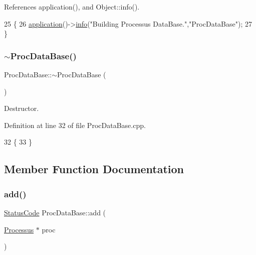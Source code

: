 References application(), and Object\+::info().


\begin{DoxyCode}
25                              \{
26   \hyperlink{Tools_8h_a27885a3c35afe79029fb830f32f66458}{application}()->\hyperlink{classObject_a644fd329ea4cb85f54fa6846484b84a8}{info}(\textcolor{stringliteral}{"Building Processus DataBase."},\textcolor{stringliteral}{"ProcDataBase"});
27 \}
\end{DoxyCode}
\mbox{\label{classProcDataBase_a65ec1212978a4996b5132bfaf1d0738d}} 
\subsubsection{\texorpdfstring{$\sim$\+Proc\+Data\+Base()}{~ProcDataBase()}}
{\footnotesize\ttfamily Proc\+Data\+Base\+::$\sim$\+Proc\+Data\+Base (\begin{DoxyParamCaption}{ }\end{DoxyParamCaption})\hspace{0.3cm}{\ttfamily [virtual]}}



Destructor. 



Definition at line 32 of file Proc\+Data\+Base.\+cpp.


\begin{DoxyCode}
32                             \{
33 \}
\end{DoxyCode}


\subsection{Member Function Documentation}
\mbox{\label{classProcDataBase_a0aafeb65a41b92a6d1fdd67f363ef826}} 
\subsubsection{\texorpdfstring{add()}{add()}}
{\footnotesize\ttfamily \hyperlink{classStatusCode}{Status\+Code} Proc\+Data\+Base\+::add (\begin{DoxyParamCaption}\item[{\hyperlink{classProcessus}{Processus} $\ast$}]{proc }\end{DoxyParamCaption})}



